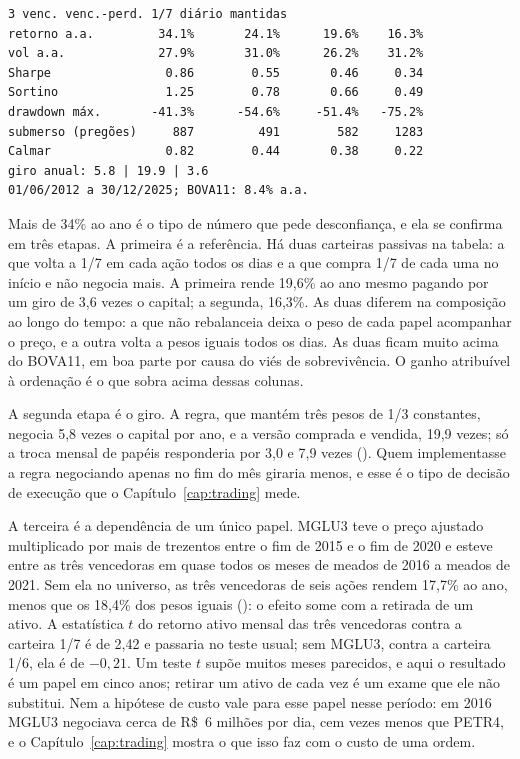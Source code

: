 
\begin{lstlisting}[style=saida]
                   3 venc. venc.-perd. 1/7 diário mantidas
retorno a.a.         34.1%       24.1%      19.6%    16.3%
vol a.a.             27.9%       31.0%      26.2%    31.2%
Sharpe                0.86        0.55       0.46     0.34
Sortino               1.25        0.78       0.66     0.49
drawdown máx.       -41.3%      -54.6%     -51.4%   -75.2%
submerso (pregões)     887         491        582     1283
Calmar                0.82        0.44       0.38     0.22
giro anual: 5.8 | 19.9 | 3.6
01/06/2012 a 30/12/2025; BOVA11: 8.4% a.a.
\end{lstlisting}

Mais de 34\% ao ano é o tipo de número que pede desconfiança, e ela se confirma em três etapas. A primeira é a referência. Há duas carteiras passivas na tabela: a que volta a 1/7 em cada ação todos os dias e a que compra 1/7 de cada uma no início e não negocia mais. A primeira rende 19,6\% ao ano mesmo pagando por um giro de 3,6 vezes o capital; a segunda, 16,3\%. As duas diferem na composição ao longo do tempo: a que não rebalanceia deixa o peso de cada papel acompanhar o preço, e a outra volta a pesos iguais todos os dias. As duas ficam muito acima do BOVA11, em boa parte por causa do viés de sobrevivência. O ganho atribuível à ordenação é o que sobra acima dessas colunas.

A segunda etapa é o giro. A regra, que mantém três pesos de 1/3 constantes, negocia 5,8 vezes o capital por ano, e a versão comprada e vendida, 19,9 vezes; só a troca mensal de papéis responderia por 3,0 e 7,9 vezes (). Quem implementasse a regra negociando apenas no fim do mês giraria menos, e esse é o tipo de decisão de execução que o Capítulo~\ref{cap:trading} mede.

A terceira é a dependência de um único papel. MGLU3 teve o preço ajustado multiplicado por mais de trezentos entre o fim de 2015 e o fim de 2020 e esteve entre as três vencedoras em quase todos os meses de meados de 2016 a meados de 2021. Sem ela no universo, as três vencedoras de seis ações rendem 17,7\% ao ano, menos que os 18,4\% dos pesos iguais (): o efeito some com a retirada de um ativo. A estatística $t$ do retorno ativo mensal das três vencedoras contra a carteira 1/7 é de 2,42 e passaria no teste usual; sem MGLU3, contra a carteira 1/6, ela é de $-0,21$. Um teste $t$ supõe muitos meses parecidos, e aqui o resultado é um papel em cinco anos; retirar um ativo de cada vez é um exame que ele não substitui. Nem a hipótese de custo vale para esse papel nesse período: em 2016 MGLU3 negociava cerca de R\$~6 milhões por dia, cem vezes menos que PETR4, e o Capítulo~\ref{cap:trading} mostra o que isso faz com o custo de uma ordem.

